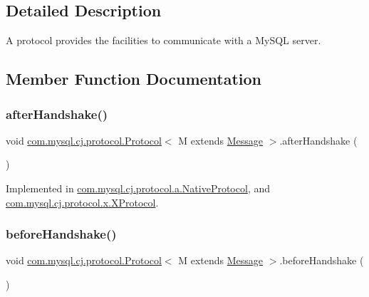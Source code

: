 \subsection{Detailed Description}
A protocol provides the facilities to communicate with a My\+S\+QL server. 

\subsection{Member Function Documentation}
\mbox{\label{interfacecom_1_1mysql_1_1cj_1_1protocol_1_1_protocol_ab5abac8e23590e55ada2b133ce963a5c}} 
\subsubsection{\texorpdfstring{after\+Handshake()}{afterHandshake()}}
{\footnotesize\ttfamily void \mbox{\hyperlink{interfacecom_1_1mysql_1_1cj_1_1protocol_1_1_protocol}{com.\+mysql.\+cj.\+protocol.\+Protocol}}$<$ M extends \mbox{\hyperlink{interfacecom_1_1mysql_1_1cj_1_1protocol_1_1_message}{Message}} $>$.after\+Handshake (\begin{DoxyParamCaption}{ }\end{DoxyParamCaption})}



Implemented in \mbox{\hyperlink{classcom_1_1mysql_1_1cj_1_1protocol_1_1a_1_1_native_protocol_a085d0d9db853b6e0ba5a88f52e19a3ed}{com.\+mysql.\+cj.\+protocol.\+a.\+Native\+Protocol}}, and \mbox{\hyperlink{classcom_1_1mysql_1_1cj_1_1protocol_1_1x_1_1_x_protocol_aef11da33d3a3b55663631eab148e8018}{com.\+mysql.\+cj.\+protocol.\+x.\+X\+Protocol}}.

\mbox{\label{interfacecom_1_1mysql_1_1cj_1_1protocol_1_1_protocol_ab775cf8ac0a9bec0df8c4a473c804ae8}} 
\subsubsection{\texorpdfstring{before\+Handshake()}{beforeHandshake()}}
{\footnotesize\ttfamily void \mbox{\hyperlink{interfacecom_1_1mysql_1_1cj_1_1protocol_1_1_protocol}{com.\+mysql.\+cj.\+protocol.\+Protocol}}$<$ M extends \mbox{\hyperlink{interfacecom_1_1mysql_1_1cj_1_1protocol_1_1_message}{Message}} $>$.before\+Handshake (\begin{DoxyParamCaption}{ }\end{DoxyParamCaption})}



